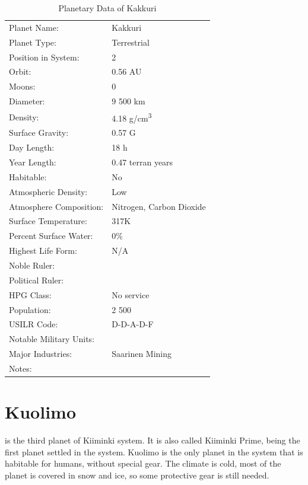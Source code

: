 \documentclass{tufte-book}
\begin{document}
\bigskip
\begin{table}
\begin{minipage}{\textwidth}
\begin{center}
\begin{tabular}{ll}
\toprule
Planet Name: & Kakkuri \\
Planet Type: & Terrestrial \\
Position in System: & 2 \\
Orbit: & 0.56 AU \\
Moons: & 0 \\
Diameter: & 9 500 km \\
Density: & 4.18 g/cm\textsuperscript{3} \\
Surface Gravity: & 0.57 G \\
Day Length: & 18 h \\
Year Length: & 0.47 terran years \\
Habitable: & No \\
\quad Atmospheric Density: & Low \\
\quad Atmosphere Composition: & Nitrogen, Carbon Dioxide \\
\quad Surface Temperature: & 317K \\
\quad Percent Surface Water: & 0\% \\
\quad Highest Life Form: & N/A \\
\toprule
Noble Ruler: & \\
Political Ruler: & \\
HPG Class: & No service \\
Population: & 2 500 \\
USILR Code: & D-D-A-D-F \\
Notable Military Units: & \\
Major Industries: & Saarinen Mining \\
Notes: & \\


\bottomrule
\end{tabular}
\end{center}
\end{minipage}
\caption{Planetary Data of Kakkuri}
\end{table}

\section{Kuolimo}

 is the third planet of Kiiminki system. It is also
called Kiiminki Prime, being the first planet settled in the system.
Kuolimo is the only planet in the system that is habitable for humans,
without special gear. The climate is cold, most of the planet is covered
in snow and ice, so some protective gear is still needed.
\end{document}

